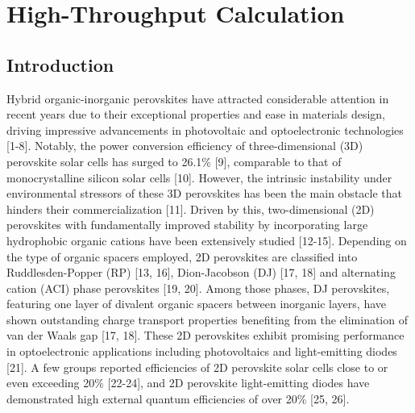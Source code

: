 \chapter[High-Throughput Calculation]{High-Throughput Calculation} \label{c:tc3} 

\section{Introduction}

Hybrid organic-inorganic perovskites have attracted considerable attention in recent years due to their exceptional properties and ease in materials design, driving impressive advancements in photovoltaic and optoelectronic technologies [1-8]. Notably, the power conversion efficiency of three-dimensional (3D) perovskite solar cells has surged to 26.1\% [9], comparable to that of monocrystalline silicon solar cells [10]. However, the intrinsic instability under environmental stressors of these 3D perovskites has been the main obstacle that hinders their commercialization [11]. Driven by this, two-dimensional (2D) perovskites with fundamentally improved stability by incorporating large hydrophobic organic cations have been extensively studied [12-15]. Depending on the type of organic spacers employed, 2D perovskites are classified into Ruddlesden-Popper (RP) [13, 16], Dion-Jacobson (DJ) [17, 18] and alternating cation (ACI) phase perovskites [19, 20].  Among those phases, DJ perovskites, featuring one layer of divalent organic spacers between inorganic layers, have shown outstanding charge transport properties benefiting from the elimination of van der Waals gap [17, 18]. These 2D perovskites exhibit promising performance in optoelectronic applications including photovoltaics and light-emitting diodes [21]. A few groups reported efficiencies of 2D perovskite solar cells close to or even exceeding 20\% [22-24], and 2D perovskite light-emitting diodes have demonstrated high external quantum efficiencies of over 20\% [25, 26].

